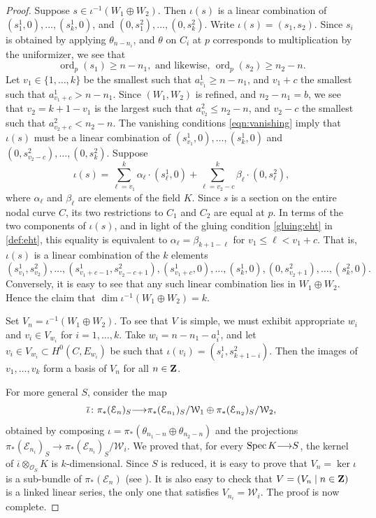 \documentclass[11pt,reqno]{amsart}
\theoremstyle{plain}
\theoremstyle{definition}
\theoremstyle{remark}
\numberwithin{equation}{section}
\renewcommand{\to}{{\longrightarrow}}
\numberwithin{equation}{section}
\renewcommand{\O}{\mathcal O}
\DeclareMathOperator{\ord}{ord}
\begin{document}
\begin{proof}
  Suppose $s \in \iota^{-1}(W_1 \oplus W_2)$.
  Then $\iota(s)$ is a linear combination of $(s^1_1,0), \dots, (s^1_k, 0)$, and $(0, s^2_1), \dots, (0,s^2_k)$.
  Write $\iota(s) = (s_1, s_2)$.
  Since $s_i$ is obtained by applying $\theta_{n-n_i}$, and $\theta$ on $C_i$ at $p$ corresponds to multiplication by the uniformizer, we see that
  \begin{equation}\label{eqn:vanishing}
    \ord_p(s_1) \geq n - n_1, \text{ and likewise, } \ord_p(s_2) \geq n_2 - n.
  \end{equation}
  Let $v_1 \in \{1, \dots, k\}$ be the smallest such that $a^1_{v_1} \geq n-n_1$, and $v_1+c$ the smallest such that $a^1_{v_1+c} > n-n_1$.
  Since $(W_1, W_2)$ is refined, and $n_2 - n_1 = b$, we see that $v_2 = k+1-v_1$ is the largest such that $a^2_{v_2} \leq n_2 - n$, and $v_2 - c$ the smallest such that $a^2_{v_2 + c} < n_2 - n$.
  The vanishing conditions \eqref{eqn:vanishing} imply that $\iota(s)$ must be a linear combination of $(s^1_{v_1},0), \dots, (s^1_k,0)$ and $(0, s^2_{v_2-c}), \dots,  (0,s^2_k)$.
  Suppose
  \[ \iota(s) = \sum_{\ell = v_1}^k \alpha_{\ell} \cdot (s^1_\ell,0) + \sum_{\ell = v_2-c}^{k} \beta_\ell \cdot (0,s^2_\ell),\]
  where $\alpha_{\ell}$ and $\beta_{\ell}$ are elements of the field $K$.
  Since $s$ is a section on the entire nodal curve $C$, its two restrictions to $C_1$ and $C_2$ are equal at $p$.
  In terms of the two components of $\iota(s)$, and in light of the gluing condition \eqref{gluing:eht} in \autoref{def:eht}, this equality is equivalent to $\alpha_{\ell} = \beta_{k+1-\ell}$ for $v_1 \leq \ell < v_1+c$.
  That is, $\iota(s)$ is a linear combination of the $k$ elements 
  \[ (s^1_{v_1} , s^2_{v_2}), \dots, (s^1_{v_1+c-1} , s^2_{v_2-c+1}), (s^1_{v_1+c},0), \dots, (s^1_k,0), (0,s^2_{v_2+1}), \dots, (s^2_{k},0).\]  
  Conversely, it is easy to see that any such linear combination lies in $W_1 \oplus W_2$.
  Hence the claim that $\dim \iota^{-1}(W_1 \oplus W_2) = k$.

  Set $V_n = \iota^{-1}(W_1 \oplus W_2)$.
  To see that $V$ is simple, we must exhibit appropriate $w_i$ and $v_i \in V_{w_i}$ for $i = 1, \dots, k$.
  Take $w_i = n-n_1-a^1_i$, and let $v_i \in V_{w_i} \subset H^0(C, E_{w_i})$ be such that $\iota(v_i) = (s^1_i, s^2_{k+1-i})$.
  Then the images of $v_1, \dots, v_k$ form a basis of $V_n$ for all $n \in {\bf Z}$.

  For more general $S$, consider the map
  \[ \overline \iota \from \pi_* (\mathcal E_n)_S \to \pi_*(\mathcal E_{n_1})_S / \mathcal W_1 \oplus \pi_*(\mathcal E_{n_2})_S / \mathcal W_2,\]
  obtained by composing $\iota = \pi_*(\theta_{n_1-n} \oplus \theta_{n_2-n})$ and the projections $\pi_*(\mathcal E_{n_i})_S \to \pi_*(\mathcal E_{n_i})_S / \mathcal W_i$.
  We proved that, for every $\spec K \to S$, the kernel of $\overline \iota \otimes_{\O_S} K$ is $k$-dimensional.
  Since $S$ is reduced, it is easy to prove that $V_n = \ker \iota$ is a sub-bundle of $\pi_*(\mathcal E_n)$ (see \cite[B.3.4 with reduced $B$]{oss:14}).
  It is also easy to check that $V = (V_n \mid n \in {\bf Z})$ is a linked linear series, the only one that satisfies $V_{n_i} = \mathcal W_i$.
  The proof is now complete.
\end{proof}
\end{document}
